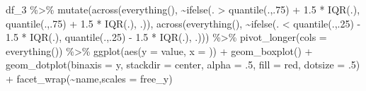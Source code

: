 \documentclass[
]{book}
\newenvironment{Shaded}{\begin{snugshade}}{\end{snugshade}}
\newcommand{\AttributeTok}[1]{\textcolor[rgb]{0.77,0.63,0.00}{#1}}
\newcommand{\DecValTok}[1]{\textcolor[rgb]{0.00,0.00,0.81}{#1}}
\newcommand{\FloatTok}[1]{\textcolor[rgb]{0.00,0.00,0.81}{#1}}
\newcommand{\FunctionTok}[1]{\textcolor[rgb]{0.00,0.00,0.00}{#1}}
\newcommand{\NormalTok}[1]{#1}
\newcommand{\SpecialCharTok}[1]{\textcolor[rgb]{0.00,0.00,0.00}{#1}}
\newcommand{\StringTok}[1]{\textcolor[rgb]{0.31,0.60,0.02}{#1}}
\begin{document}
\begin{Shaded}
\begin{Highlighting}[]
\NormalTok{df\_3 }\SpecialCharTok{\%\textgreater{}\%} 
  \FunctionTok{mutate}\NormalTok{(}\FunctionTok{across}\NormalTok{(}\FunctionTok{everything}\NormalTok{(),}
                \SpecialCharTok{\textasciitilde{}}\FunctionTok{ifelse}\NormalTok{(. }\SpecialCharTok{\textgreater{}}  \FunctionTok{quantile}\NormalTok{(.,.}\DecValTok{75}\NormalTok{) }\SpecialCharTok{+} \FloatTok{1.5} \SpecialCharTok{*} \FunctionTok{IQR}\NormalTok{(.),}
                        \FunctionTok{quantile}\NormalTok{(.,.}\DecValTok{75}\NormalTok{) }\SpecialCharTok{+} \FloatTok{1.5} \SpecialCharTok{*} \FunctionTok{IQR}\NormalTok{(.),}
\NormalTok{                        .)),}
         \FunctionTok{across}\NormalTok{(}\FunctionTok{everything}\NormalTok{(),}
                \SpecialCharTok{\textasciitilde{}}\FunctionTok{ifelse}\NormalTok{(. }\SpecialCharTok{\textless{}}  \FunctionTok{quantile}\NormalTok{(.,.}\DecValTok{25}\NormalTok{) }\SpecialCharTok{{-}} \FloatTok{1.5} \SpecialCharTok{*} \FunctionTok{IQR}\NormalTok{(.),}
                        \FunctionTok{quantile}\NormalTok{(.,.}\DecValTok{25}\NormalTok{) }\SpecialCharTok{{-}} \FloatTok{1.5} \SpecialCharTok{*} \FunctionTok{IQR}\NormalTok{(.),}
\NormalTok{                        .))) }\SpecialCharTok{\%\textgreater{}\%} 
\FunctionTok{pivot\_longer}\NormalTok{(}\AttributeTok{cols =} \FunctionTok{everything}\NormalTok{()) }\SpecialCharTok{\%\textgreater{}\%} 
  \FunctionTok{ggplot}\NormalTok{(}\FunctionTok{aes}\NormalTok{(}\AttributeTok{y =}\NormalTok{ value, }\AttributeTok{x =} \StringTok{\textquotesingle{}\textquotesingle{}}\NormalTok{)) }\SpecialCharTok{+}
  \FunctionTok{geom\_boxplot}\NormalTok{() }\SpecialCharTok{+}
  \FunctionTok{geom\_dotplot}\NormalTok{(}\AttributeTok{binaxis =} \StringTok{\textquotesingle{}y\textquotesingle{}}\NormalTok{,}
               \AttributeTok{stackdir =} \StringTok{\textquotesingle{}center\textquotesingle{}}\NormalTok{,}
               \AttributeTok{alpha =}\NormalTok{ .}\DecValTok{5}\NormalTok{,}
               \AttributeTok{fill =} \StringTok{\textquotesingle{}red\textquotesingle{}}\NormalTok{,}
               \AttributeTok{dotsize =}\NormalTok{ .}\DecValTok{5}\NormalTok{) }\SpecialCharTok{+}
  \FunctionTok{facet\_wrap}\NormalTok{(}\SpecialCharTok{\textasciitilde{}}\NormalTok{name,}\AttributeTok{scales =} \StringTok{\textquotesingle{}free\_y\textquotesingle{}}\NormalTok{)}
\end{Highlighting}
\end{Shaded}
\end{document}
